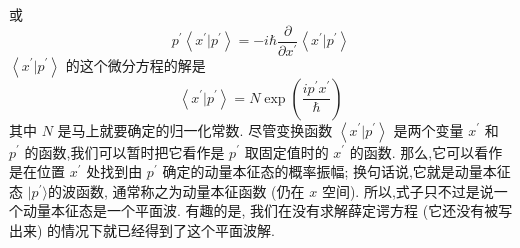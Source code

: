或
\begin{equation}
	{p}^{\prime }\left\langle {{x}^{\prime } | {p}^{\prime }}\right\rangle = - i\hbar \frac{\partial }{\partial {x}^{\prime }}\left\langle {{x}^{\prime } | {p}^{\prime }}\right\rangle
\end{equation}
$\left\langle {{x}^{\prime } | {p}^{\prime }}\right\rangle$ 的这个微分方程的解是
\begin{equation}
	\left\langle {{x}^{\prime } | {p}^{\prime }}\right\rangle = N\exp \left( \frac{i{p}^{\prime }{x}^{\prime }}{\hbar }\right)
\end{equation}
其中 $N$ 是马上就要确定的归一化常数. 尽管变换函数 $\left\langle {{x}^{\prime } | {p}^{\prime }}\right\rangle$ 是两个变量 ${x}^{\prime }$ 和 ${p}^{\prime }$ 的函数,我们可以暂时把它看作是 ${p}^{\prime }$ 取固定值时的 ${x}^{\prime }$ 的函数. 那么,它可以看作是在位置 ${x}^{\prime }$ 处找到由 ${p}^{\prime }$ 确定的动量本征态的概率振幅; 换句话说,它就是动量本征态 $|{p}^{\prime }\rangle$的波函数, 通常称之为动量本征函数 (仍在 $x$ 空间). 所以,式子只不过是说一个动量本征态是一个平面波. 有趣的是, 我们在没有求解薛定谔方程 (它还没有被写出来) 的情况下就已经得到了这个平面波解.

